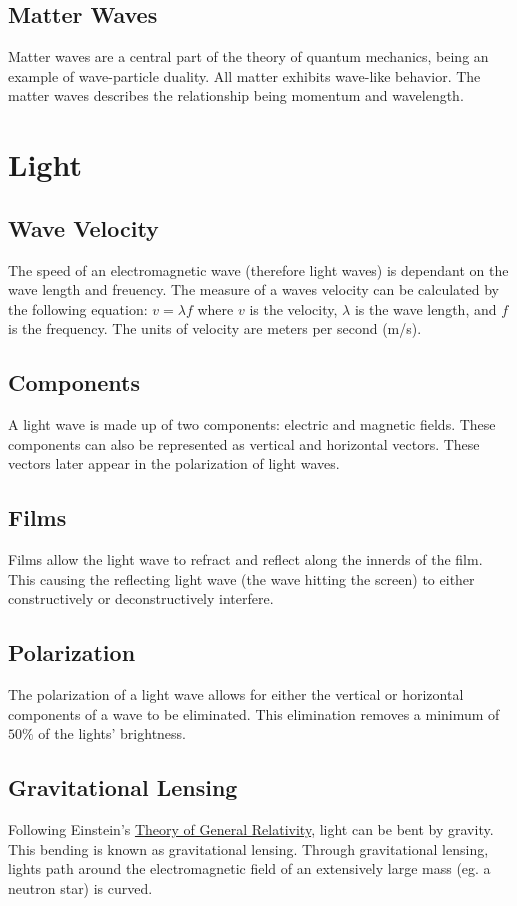 \documentclass{article}
\begin{document}
\subsection{Matter Waves}
Matter waves are a central part of the theory of quantum mechanics, being an example of wave-particle duality. All matter exhibits wave-like behavior. The matter waves describes the relationship being momentum and wavelength.


\section{Light}
\subsection{Wave Velocity}
The speed of an electromagnetic wave (therefore light waves) is dependant on the wave length and freuency. The measure of a waves velocity can be calculated by the following equation: $v = \lambda f$ where $v$ is the velocity, $\lambda$ is the wave length, and $f$ is the frequency. The units of velocity are meters per second (m/s).

\subsection{Components}
A light wave is made up of two components: electric and magnetic fields. These components can also be represented as vertical and horizontal vectors. These vectors later appear in the polarization of light waves.

\subsection{Films}
Films allow the light wave to refract and reflect along the innerds of the film. This causing the reflecting light wave (the wave hitting the screen) to either constructively or deconstructively interfere.

\subsection{Polarization}
The polarization of a light wave allows for either the vertical or horizontal components of a wave to be eliminated. This elimination removes a minimum of $50\%$ of the lights' brightness.

\subsection{Gravitational Lensing}
Following Einstein's \hyperref[sec:generalrelativity]{Theory of General Relativity}, light can be bent by gravity. This bending is known as gravitational lensing. Through gravitational lensing, lights path around the electromagnetic field of an extensively large mass (eg. a neutron star) is curved.
\end{document}
